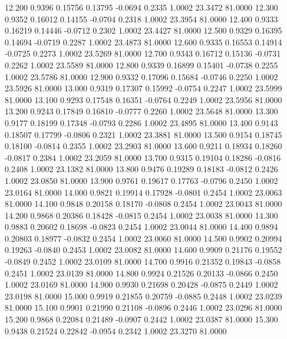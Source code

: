   12.200   0.9396   0.15756   0.13795  -0.0694   0.2335   1.0002  23.3472  81.0000
  12.300   0.9352   0.16012   0.14155  -0.0704   0.2318   1.0002  23.3954  81.0000
  12.400   0.9333   0.16219   0.14446  -0.0712   0.2302   1.0002  23.4427  81.0000
  12.500   0.9329   0.16395   0.14694  -0.0719   0.2287   1.0002  23.4873  81.0000
  12.600   0.9335   0.16553   0.14914  -0.0725   0.2273   1.0002  23.5269  81.0000
  12.700   0.9343   0.16712   0.15136  -0.0731   0.2262   1.0002  23.5589  81.0000
  12.800   0.9339   0.16899   0.15401  -0.0738   0.2255   1.0002  23.5786  81.0000
  12.900   0.9332   0.17096   0.15684  -0.0746   0.2250   1.0002  23.5926  81.0000
  13.000   0.9319   0.17307   0.15992  -0.0754   0.2247   1.0002  23.5999  81.0000
  13.100   0.9293   0.17548   0.16351  -0.0764   0.2249   1.0002  23.5956  81.0000
  13.200   0.9243   0.17849   0.16810  -0.0777   0.2260   1.0002  23.5648  81.0000
  13.300   0.9177   0.18199   0.17348  -0.0793   0.2286   1.0002  23.4895  81.0000
  13.400   0.9143   0.18507   0.17799  -0.0806   0.2321   1.0002  23.3881  81.0000
  13.500   0.9154   0.18745   0.18100  -0.0814   0.2355   1.0002  23.2903  81.0000
  13.600   0.9211   0.18934   0.18260  -0.0817   0.2384   1.0002  23.2059  81.0000
  13.700   0.9315   0.19104   0.18286  -0.0816   0.2408   1.0002  23.1382  81.0000
  13.800   0.9476   0.19289   0.18183  -0.0812   0.2426   1.0002  23.0850  81.0000
  13.900   0.9761   0.19617   0.17763  -0.0796   0.2450   1.0002  23.0164  81.0000
  14.000   0.9821   0.19914   0.17928  -0.0801   0.2454   1.0002  23.0063  81.0000
  14.100   0.9848   0.20158   0.18170  -0.0808   0.2454   1.0002  23.0043  81.0000
  14.200   0.9868   0.20386   0.18428  -0.0815   0.2454   1.0002  23.0038  81.0000
  14.300   0.9883   0.20602   0.18698  -0.0823   0.2454   1.0002  23.0044  81.0000
  14.400   0.9894   0.20803   0.18977  -0.0832   0.2454   1.0002  23.0060  81.0000
  14.500   0.9902   0.20994   0.19263  -0.0840   0.2453   1.0002  23.0082  81.0000
  14.600   0.9909   0.21176   0.19552  -0.0849   0.2452   1.0002  23.0109  81.0000
  14.700   0.9916   0.21352   0.19843  -0.0858   0.2451   1.0002  23.0139  81.0000
  14.800   0.9924   0.21526   0.20133  -0.0866   0.2450   1.0002  23.0169  81.0000
  14.900   0.9930   0.21698   0.20428  -0.0875   0.2449   1.0002  23.0198  81.0000
  15.000   0.9919   0.21855   0.20759  -0.0885   0.2448   1.0002  23.0239  81.0000
  15.100   0.9901   0.21990   0.21108  -0.0896   0.2446   1.0002  23.0296  81.0000
  15.200   0.9868   0.22084   0.21489  -0.0907   0.2442   1.0002  23.0387  81.0000
  15.300   0.9438   0.21524   0.22842  -0.0954   0.2342   1.0002  23.3270  81.0000
